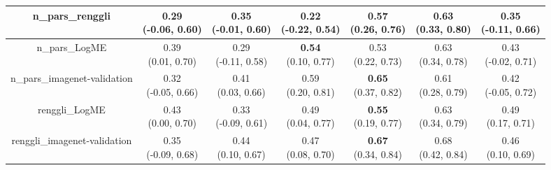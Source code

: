 \begin{table}[H]
\begin{tabular}{c|cccccc}
\hline
n_pars_renggli & \makecell{0.29 \\[0pt] (-0.06, 0.60)} & \makecell{0.35 \\[0pt] (-0.01, 0.60)} & \makecell{0.22 \\[0pt] (-0.22, 0.54)} & \makecell{\textbf{0.57} \\[0pt] (0.26, 0.76)} & \makecell{0.63 \\[0pt] (0.33, 0.80)} & \makecell{0.35 \\[0pt] (-0.11, 0.66)} \\
\hline
n_pars_LogME & \makecell{0.39 \\[0pt] (0.01, 0.70)} & \makecell{0.29 \\[0pt] (-0.11, 0.58)} & \makecell{\textbf{0.54} \\[0pt] (0.10, 0.77)} & \makecell{0.53 \\[0pt] (0.22, 0.73)} & \makecell{0.63 \\[0pt] (0.34, 0.78)} & \makecell{0.43 \\[0pt] (-0.02, 0.71)} \\
\hline
n_pars_imagenet-validation & \makecell{0.32 \\[0pt] (-0.05, 0.66)} & \makecell{0.41 \\[0pt] (0.03, 0.66)} & \makecell{0.59 \\[0pt] (0.20, 0.81)} & \makecell{\textbf{0.65} \\[0pt] (0.37, 0.82)} & \makecell{0.61 \\[0pt] (0.28, 0.79)} & \makecell{0.42 \\[0pt] (-0.05, 0.72)} \\
\hline
renggli_LogME & \makecell{0.43 \\[0pt] (0.00, 0.70)} & \makecell{0.33 \\[0pt] (-0.09, 0.61)} & \makecell{0.49 \\[0pt] (0.04, 0.77)} & \makecell{\textbf{0.55} \\[0pt] (0.19, 0.77)} & \makecell{0.63 \\[0pt] (0.34, 0.79)} & \makecell{0.49 \\[0pt] (0.17, 0.71)} \\
\hline
renggli_imagenet-validation & \makecell{0.35 \\[0pt] (-0.09, 0.68)} & \makecell{0.44 \\[0pt] (0.10, 0.67)} & \makecell{0.47 \\[0pt] (0.08, 0.70)} & \makecell{\textbf{0.67} \\[0pt] (0.34, 0.84)} & \makecell{0.68 \\[0pt] (0.42, 0.84)} & \makecell{0.46 \\[0pt] (0.10, 0.69)} \\

\end{tabular}
\end{table}
